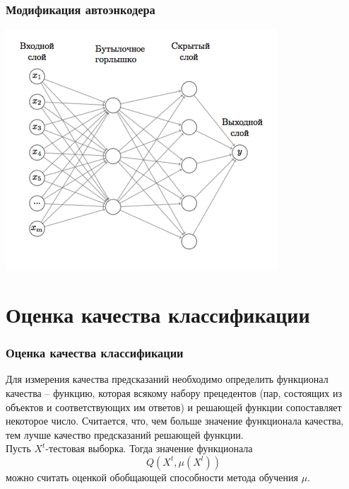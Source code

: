 \documentclass{beamer}
\begin{document}
\begin{frame}
\frametitle{Модификация автоэнкодера}
\begin{center}
	\includegraphics[width=\linewidth,height=.7\textheight,keepaspectratio]{modified_encoder.png}
\end{center}
\end{frame}


\section{Оценка качества классификации}
\begin{frame}
\end{frame}

\begin{frame}
\frametitle{Оценка качества классификации}
Для измерения качества предсказаний необходимо определить функционал
качества – функцию, которая всякому набору прецедентов (пар, состоящих из
объектов и соответствующих им ответов) и решающей функции сопоставляет
некоторое число. Считается, что, чем больше значение функционала качества, тем лучше качество предсказаний решающей функции.
\newline
\newline
\\
Пусть $X^t$-тестовая выборка. Тогда значение функционала $$Q(X^t,\mu(X^l))$$ можно считать оценкой обобщающей способности метода обучения $\mu$.
\end{frame}
\end{document}

